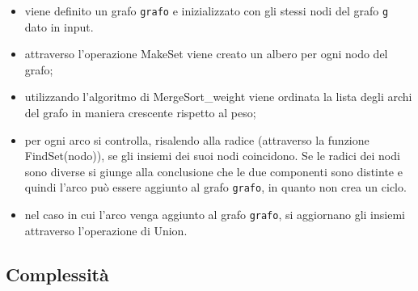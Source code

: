 \begin{itemize}
    
    \item viene definito un grafo \texttt{grafo} e inizializzato con gli stessi nodi del grafo \texttt{g} dato in input.
    
    \item attraverso l'operazione MakeSet viene creato un albero per ogni nodo del grafo;
    
    \item utilizzando l'algoritmo di MergeSort\_weight viene ordinata la lista degli archi del grafo in maniera crescente rispetto al peso;
    
    \item per ogni arco si controlla, risalendo alla radice (attraverso la funzione FindSet(nodo)), se gli insiemi dei suoi nodi coincidono. Se le radici dei nodi sono diverse si giunge alla conclusione che le due componenti sono distinte e quindi l'arco può essere aggiunto al grafo \texttt{grafo}, in quanto non crea un ciclo. 
    
    \item nel caso in cui l'arco venga aggiunto al grafo \texttt{grafo}, si aggiornano gli insiemi attraverso l'operazione di Union.
\end{itemize}


\subsection{Complessità}
\label{complessità}